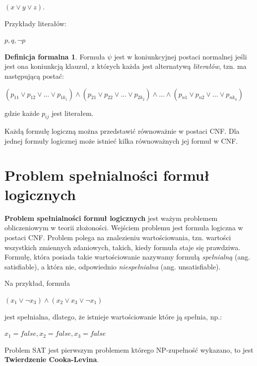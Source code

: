 \documentclass[a4paper,12pt,oneside]{book}
\theoremstyle{definition}
\newtheorem*{formal}{Definicja formalna}
\begin{document}
\begin{center}
    $(x \lor y \lor z)$. 
\end{center}

Przykłady literałów:

\begin{center}
    $p, q, \neg p$
\end{center}

\begin{formal}
    Formuła $\psi$ jest w koniunkcyjnej postaci normalnej jeśli jest ona koniunkcją klauzul, z których każda jest alternatywą \textit{literałów}, tzn. ma następującą postać: 
    \begin{center}
    $(p_{11} \lor p_{12} \lor \ldots \lor p_{1{k_1}}) \land (p_{21} \lor p_{22} \lor \ldots \lor p_{2{k_2}}) \land \ldots \land (p_{n1} \lor p_{n2} \lor \ldots \lor p_{n{k_n}})$
    \end{center}
    gdzie każde $p_{ij}$ jest literałem.
\end{formal}

Każdą formułę logiczną można przedstawić równoważnie w postaci CNF. Dla jednej formuły logicznej może istnieć kilka równoważnych jej formuł w CNF.  

\section{Problem spełnialności formuł logicznych}

\textbf{Problem spełnialności formuł logicznych} jest ważym problemem obliczeniowym w teorii złożoności. Wejściem problemu jest formuła logiczna w postaci CNF. Problem polega na znalezieniu wartościowania, tzn. wartości wszystkich zmiennych zdaniowych, takich, kiedy formuła staje się prawdziwa. Formułę, która posiada takie wartościowanie nazywamy formułą \textit{spełnialną} (ang. satisfiable), a która nie, odpowiednio \textit{niespełnialna} (ang. unsatisfiable).

Na przykład, formuła
\begin{center}
    $(x_1 \lor \neg x_3) \land (x_2 \lor x_3 \lor \neg x_1)$
\end{center}

jest spełnialna, dlatego, że istnieje wartościowanie które ją spełnia, np.:
\begin{center}
    $x_1 = false, x_2 = false, x_3 = false$
\end{center}

Problem SAT jest pierwszym problemem którego NP-zupełność wykazano, to jest \textbf{Twierdzenie Cooka-Levina}.
\end{document}
